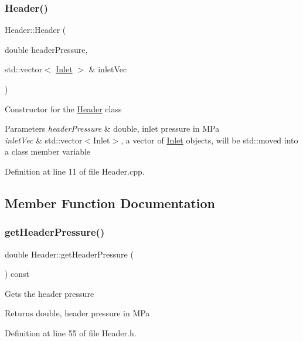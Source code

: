 \subsubsection{\texorpdfstring{Header()}{Header()}}
{\footnotesize\ttfamily Header\+::\+Header (\begin{DoxyParamCaption}\item[{double}]{header\+Pressure,  }\item[{std\+::vector$<$ \hyperlink{class_inlet}{Inlet} $>$ \&}]{inlet\+Vec }\end{DoxyParamCaption})}

Constructor for the \hyperlink{class_header}{Header} class


\begin{DoxyParams}{Parameters}
{\em header\+Pressure} & double, inlet pressure in M\+Pa \\
\hline
{\em inlet\+Vec} & std\+::vector$<$\+Inlet$>$, a vector of \hyperlink{class_inlet}{Inlet} objects, will be std\+::moved into a class member variable \\
\hline
\end{DoxyParams}


Definition at line 11 of file Header.\+cpp.



\subsection{Member Function Documentation}
\mbox{\label{class_header_adc2e6daaf9f5e633c3db96ff3990f1f6}} 
\subsubsection{\texorpdfstring{get\+Header\+Pressure()}{getHeaderPressure()}}
{\footnotesize\ttfamily double Header\+::get\+Header\+Pressure (\begin{DoxyParamCaption}{ }\end{DoxyParamCaption}) const\hspace{0.3cm}{\ttfamily [inline]}}

Gets the header pressure \begin{DoxyReturn}{Returns}
double, header pressure in M\+Pa 
\end{DoxyReturn}


Definition at line 55 of file Header.\+h.


